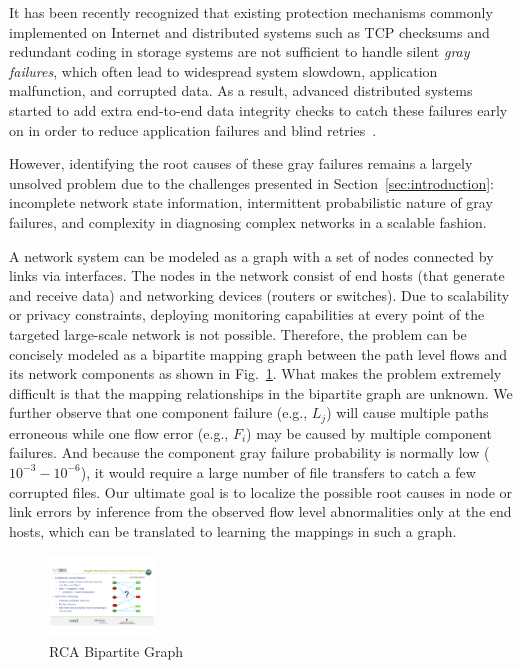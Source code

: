 It has been recently recognized that existing protection mechanisms commonly implemented on Internet and distributed systems such as TCP checksums and redundant coding in storage systems are not sufficient to handle silent {\it gray failures}, which often lead to widespread system slowdown, application malfunction, and corrupted data. As a result, advanced distributed systems started to add extra end-to-end data integrity checks to catch these failures early on in order to reduce application failures and blind retries~\cite{swip:pearc:2019}. 

However, identifying the root causes of these gray failures remains a largely unsolved problem due to the challenges presented in Section~\ref{sec:introduction}: 
incomplete network state information, intermittent probabilistic nature of gray failures, and complexity in diagnosing complex networks in a scalable fashion.  

A network system can be modeled as a graph with a set of nodes connected by links via interfaces. The nodes in the network consist of end hosts (that generate and receive data) and networking devices (routers or switches). Due to scalability or privacy constraints, deploying monitoring capabilities at every point of the targeted large-scale network is not possible. Therefore, the problem can be concisely modeled as a bipartite mapping graph between the path level flows and its network components as shown in Fig.~\ref{fig:bipartite}. What makes the problem extremely difficult is that the mapping relationships in the bipartite graph are unknown. We further observe that one component failure (e.g., $L_j$) will cause multiple paths erroneous while one flow error (e.g., $F_i$) may be caused by multiple component failures. And because the component gray failure probability is normally low ($10^{-3} - 10^{-6}$), it would require a large number of file transfers to catch a few corrupted files. Our ultimate goal is to localize the possible root causes in node or link errors by inference from the observed flow level abnormalities only at the end hosts, which can be translated to learning the mappings in such a graph.

\begin{figure}
  \begin{center}
    \includegraphics[width=0.25\textwidth]{./figure/RCABipartite}
  \end{center}
  \vspace{-5pt}
\caption{RCA Bipartite Graph}
\vspace{-5pt}
\label{fig:bipartite}
\end{figure}

